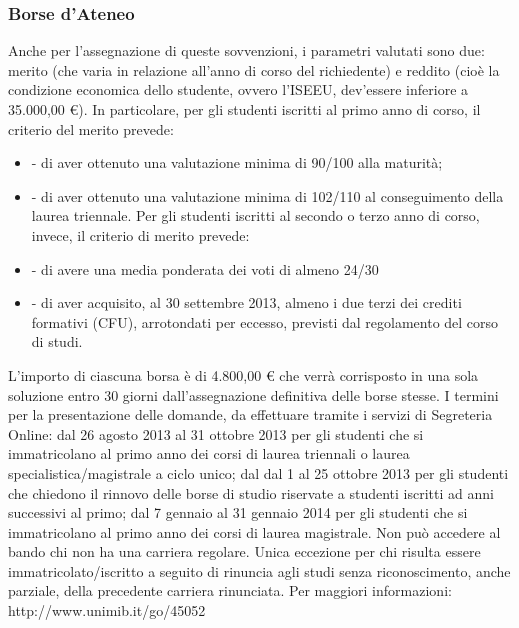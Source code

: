 \subsubsection{Borse d'Ateneo}
Anche per l'assegnazione di queste sovvenzioni, i parametri valutati sono due: merito (che varia in relazione all'anno di corso del richiedente) e reddito (cioè la condizione economica dello studente, ovvero l'ISEEU, dev'essere inferiore a 35.000,00 €). 
In particolare, per gli studenti iscritti al primo anno di corso, il criterio del merito prevede: 
\begin{itemize}   
\item- di aver ottenuto una valutazione minima di 90/100 alla maturità; 
\item- di aver ottenuto una valutazione minima di 102/110 al conseguimento della laurea triennale. 
Per gli studenti iscritti al secondo o terzo anno di corso, invece, il criterio di merito prevede: 
\item- di avere una media ponderata dei voti di almeno 24/30 
\item- di  aver acquisito, al 30 settembre 2013, almeno i  due terzi dei crediti formativi (CFU), arrotondati per eccesso, previsti dal regolamento del corso di studi. 
\end{itemize}
L'importo di ciascuna borsa è di 4.800,00 € che verrà corrisposto in una sola soluzione entro 30 giorni dall'assegnazione definitiva delle borse stesse.
I termini per la  presentazione delle domande, da effettuare tramite i servizi di Segreteria Online: dal 26 agosto 2013 al 31 ottobre 2013 per gli studenti che si immatricolano al primo anno dei corsi di laurea triennali o laurea specialistica/magistrale a ciclo unico; dal dal 1 al 25 ottobre 2013 per gli studenti che chiedono il rinnovo delle borse di studio riservate a studenti iscritti ad anni successivi al primo; dal 7 gennaio al 31 gennaio 2014 per gli studenti che si immatricolano al primo anno dei corsi di laurea magistrale. 
Non può accedere al bando chi non ha una carriera regolare. Unica eccezione per chi risulta essere immatricolato/iscritto a seguito di rinuncia agli studi senza riconoscimento, anche parziale, della precedente carriera rinunciata.
Per maggiori informazioni: http://www.unimib.it/go/45052
